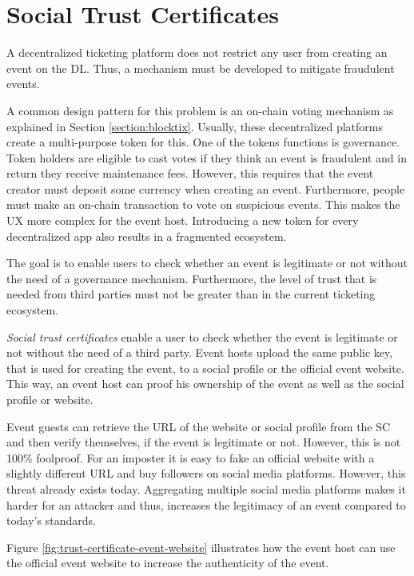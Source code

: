 
\section{Social Trust Certificates}\label{section:social-trust-certificates}

A decentralized ticketing platform does not restrict any user from creating an event on the DL. Thus, a mechanism must be developed to mitigate fraudulent events.

A common design pattern for this problem is an on-chain voting mechanism as explained in Section \ref{section:blocktix}. Usually, these decentralized platforms create a multi-purpose token for this. One of the tokens functions is governance. Token holders are eligible to cast votes if they think an event is fraudulent and in return they receive maintenance fees. However, this requires that the event creator must deposit some currency when creating an event. Furthermore, people must make an on-chain transaction to vote on suspicious events. This makes the UX more complex for the event host. Introducing a new token for every decentralized app also results in a fragmented ecosystem.

The goal is to enable users to check whether an event is legitimate or not without the need of a governance mechanism. Furthermore, the level of trust that is needed from third parties must not be greater than in the current ticketing ecosystem. 

\textit{Social trust certificates} enable a user to check whether the event is legitimate or not without the need of a third party. Event hosts upload the same public key, that is used for creating the event, to a social profile or the official event website. This way, an event host can proof his ownership of the event as well as the social profile or website. 

Event guests can retrieve the URL of the website or social profile from the SC and then verify themselves, if the event is legitimate or not. However, this is not 100\% foolproof. For an imposter it is easy to fake an official website with a slightly different URL and buy followers on social media platforms. However, this threat already exists today. Aggregating multiple social media platforms makes it harder for an attacker and thus, increases the legitimacy of an event compared to today's standards. 

Figure \ref{fig:trust-certificate-event-website} illustrates how the event host can use the official event website to increase the authenticity of the event. 

